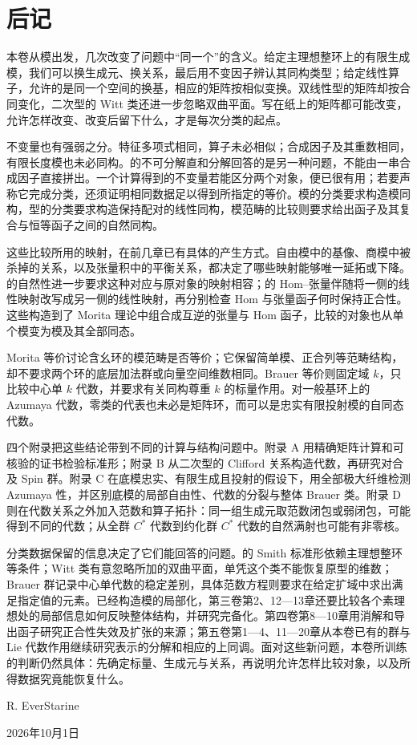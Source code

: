 \chapter*{后记}

本卷从模出发，几次改变了问题中“同一个”的含义。给定主理想整环上的有限生成模，我们可以换生成元、换关系，最后用不变因子辨认其同构类型；给定线性算子，允许的是同一个空间的换基，相应的矩阵按相似变换。双线性型的矩阵却按合同变化，二次型的 Witt 类还进一步忽略双曲平面。写在纸上的矩阵都可能改变，允许怎样改变、改变后留下什么，才是每次分类的起点。

\ProseParagraphBreak
不变量也有强弱之分。特征多项式相同，算子未必相似；合成因子及其重数相同，有限长度模也未必同构。的不可分解直和分解回答的是另一种问题，不能由一串合成因子直接拼出。一个计算得到的不变量若能区分两个对象，便已很有用；若要声称它完成分类，还须证明相同数据足以得到所指定的等价。模的分类要求构造模同构，型的分类要求构造保持配对的线性同构，模范畴的比较则要求给出函子及其复合与恒等函子之间的自然同构。

\ProseParagraphBreak
这些比较所用的映射，在前几章已有具体的产生方式。自由模中的基像、商模中被杀掉的关系，以及张量积中的平衡关系，都决定了哪些映射能够唯一延拓或下降。的自然性进一步要求这种对应与原对象的映射相容；的 Hom--张量伴随将一侧的线性映射改写成另一侧的线性映射，再分别检查 Hom 与张量函子何时保持正合性。这些构造到了 Morita 理论中组合成互逆的张量与 Hom 函子，比较的对象也从单个模变为模及其全部同态。

\ProseParagraphBreak
Morita 等价讨论含幺环的模范畴是否等价；它保留简单模、正合列等范畴结构，却不要求两个环的底层加法群或向量空间维数相同。Brauer 等价则固定域 \(k\)，只比较中心单 \(k\) 代数，并要求有关同构尊重 \(k\) 的标量作用。对一般基环上的 Azumaya 代数，零类的代表也未必是矩阵环，而可以是忠实有限投射模的自同态代数。

\ProseParagraphBreak
四个附录把这些结论带到不同的计算与结构问题中。附录 A 用精确矩阵计算和可核验的证书检验标准形；附录 B 从二次型的 Clifford 关系构造代数，再研究对合及 Spin 群。附录 C 在底模忠实、有限生成且投射的假设下，用全部极大纤维检测 Azumaya 性，并区别底模的局部自由性、代数的分裂与整体 Brauer 类。附录 D 则在代数关系之外加入范数和算子拓扑：同一组生成元取范数闭包或弱闭包，可能得到不同的代数；从全群 \(C^*\) 代数到约化群 \(C^*\) 代数的自然满射也可能有非零核。

\ProseParagraphBreak
分类数据保留的信息决定了它们能回答的问题。的 Smith 标准形依赖主理想整环等条件；Witt 类有意忽略所加的双曲平面，单凭这个类不能恢复原型的维数；Brauer 群记录中心单代数的稳定差别，具体范数方程则要求在给定扩域中求出满足指定值的元素。已经构造模的局部化，第三卷第2、12—13章还要比较各个素理想处的局部信息如何反映整体结构，并研究完备化。第四卷第8—10章用消解和导出函子研究正合性失效及扩张的来源；第五卷第1—4、11—20章从本卷已有的群与 Lie 代数作用继续研究表示的分解和相应的上同调。面对这些新问题，本卷所训练的判断仍然具体：先确定标量、生成元与关系，再说明允许怎样比较对象，以及所得数据究竟能恢复什么。

\bigskip
\begin{flushright}
	R. EverStarine

	2026年10月1日
\end{flushright}
